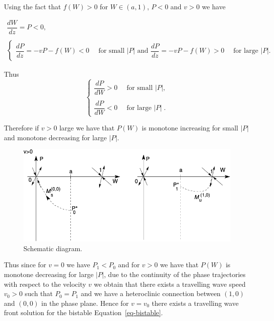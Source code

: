 \documentclass[
  letterpaper,
  DIV=11,
  numbers=noendperiod]{scrreprt}
\theoremstyle{plain}
\theoremstyle{definition}
\theoremstyle{plain}
\theoremstyle{remark}
\begin{document}
Using the fact that \(f(W) >0\) for \(W \in (a,1)\), \(P<0\) and \(v>0\)
we have

\[
\begin{aligned}
\dfrac{dW}{dz} = P <0, \\
\\
\begin{cases}
\dfrac{dP}{dz} = -vP- f(W) <0  \quad \text{ for small }  |P| \textrm{ and } 
 \dfrac{dP}{dz} = -vP- f(W) >0  \quad \text{ for large  } |P|.
\end{cases} 
\end{aligned}
\]

Thus \[
\begin{cases}
\dfrac{dP}{dW}   >0 \quad    \text{ for small }  |P| ,\\
\\
\dfrac{dP}{dW}  <0  \quad  \text{ for large }  |P|\; .
\end{cases}
\]

Therefore if \(v>0\) large we have that \(P(W)\) is monotone increasing
for small \(|P|\) and monotone decreasing for large \(|P|\).

\begin{figure}

{\centering \includegraphics{fig2.png}

}

\caption{\label{fig-2eigenvectors}Schematic diagram.}

\end{figure}

Thus since for \(v=0\) we have \(P_1 < P_0\) and for \(v>0\) we have
that \(P(W)\) is monotone decreasing for large \(|P|\), due to the
continuity of the phase trajectories with respect to the velocity \(v\)
we obtain that there exists a travelling wave speed \(v_0 >0\) such that
\(P_0= P_1\) and we have a heteroclinic connection between \((1,0)\) and
\((0,0)\) in the phase plane. Hence for \(v=v_0\) there exists a
travelling wave front solution for the bistable
Equation~\ref{eq-bistable}.
\end{document}
